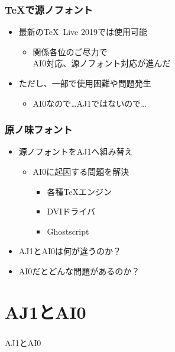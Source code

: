 \begin{frame}\frametitle{\TeX で源ノフォント}
  \begin{itemize}
  \item 最新の\TeX \ Live 2019では使用可能
    \begin{itemize}
    \item 関係各位のご尽力で\\
      AI0対応、源ノフォント対応が進んだ
    \end{itemize}
    
    \pause
  \item ただし、一部で使用困難や問題発生
    \begin{itemize}
    \item AI0なので…AJ1ではないので…
    \end{itemize}
  \end{itemize}
\end{frame}

\begin{frame}\frametitle{原ノ味フォント}
  \begin{itemize}
  \item 源ノフォントをAJ1へ組み替え
    \begin{itemize}
    \item AI0に起因する問題を解決
      \begin{itemize}
      \item 各種\TeX エンジン
      \item DVIドライバ
      \item Ghostscript
      \end{itemize}
    \end{itemize}

    \pause
  \item AJ1とAI0は何が違うのか？
  \item AI0だとどんな問題があるのか？
  \end{itemize}
\end{frame}

\section{AJ1とAI0}
\begin{frame}\frametitle{}
  \centering
  AJ1とAI0
\end{frame}

